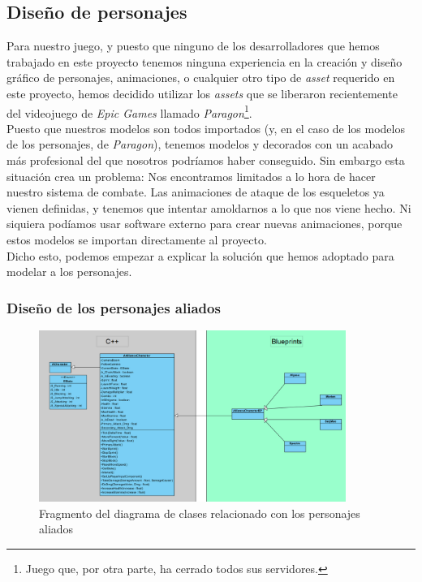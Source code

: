 \subsection{Diseño de personajes}
Para nuestro juego, y puesto que ninguno de los desarrolladores que hemos trabajado en este proyecto tenemos ninguna experiencia en la creación y diseño gráfico de personajes, animaciones, o cualquier otro tipo de \textit{asset} requerido en este proyecto, hemos decidido utilizar los \textit{assets} que se liberaron recientemente del videojuego de \textit{Epic Games} llamado \textit{Paragon}\footnote{Juego que, por otra parte, ha cerrado todos sus servidores.}.
\\

Puesto que nuestros modelos son todos importados (y, en el caso de los modelos de los personajes, de \textit{Paragon}), tenemos modelos y decorados con un acabado más profesional del que nosotros podríamos haber conseguido. Sin embargo esta situación crea un problema: Nos encontramos limitados a lo hora de hacer nuestro sistema de combate. Las animaciones de ataque de los esqueletos ya vienen definidas, y tenemos que intentar amoldarnos a lo que nos viene hecho. Ni siquiera podíamos usar software externo para crear nuevas animaciones, porque estos modelos se importan directamente al proyecto.
\\

Dicho esto, podemos empezar a explicar la solución que hemos adoptado para modelar a los personajes.

\subsubsection{Diseño de los personajes aliados}

\begin{figure}[H]
  \centering
  \includegraphics[width=10cm]{./images/Classes_Aliados.png}
  \caption{Fragmento del diagrama de clases relacionado con los personajes aliados}
  \label{ClassesAllies}
\end{figure}

